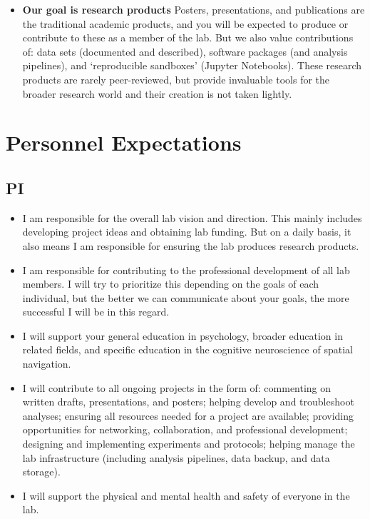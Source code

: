 \documentclass[
  12pt,
]{book}
\providecommand{\tightlist}{%
  \setlength{\itemsep}{0pt}\setlength{\parskip}{0pt}}
\begin{document}
\begin{itemize}
\item
  \textbf{Our goal is research products}
  Posters, presentations, and publications are the traditional academic products, and you will be expected to produce or contribute to these as a member of the lab. But we also value contributions of: data sets (documented and described), software packages (and analysis pipelines), and `reproducible sandboxes' (Jupyter Notebooks). These research products are rarely peer-reviewed, but provide invaluable tools for the broader research world and their creation is not taken lightly.
\end{itemize}

\hypertarget{personnel-expectations}{%
\chapter{Personnel Expectations}\label{personnel-expectations}}

\hypertarget{pi}{%
\section{PI}\label{pi}}

\begin{itemize}
\tightlist
\item
  I am responsible for the overall lab vision and direction. This mainly includes developing project ideas and obtaining lab funding. But on a daily basis, it also means I am responsible for ensuring the lab produces research products.
\item
  I am responsible for contributing to the professional development of all lab members. I will try to prioritize this depending on the goals of each individual, but the better we can communicate about your goals, the more successful I will be in this regard.
\item
  I will support your general education in psychology, broader education in related fields, and specific education in the cognitive neuroscience of spatial navigation.
\item
  I will contribute to all ongoing projects in the form of: commenting on written drafts, presentations, and posters; helping develop and troubleshoot analyses; ensuring all resources needed for a project are available; providing opportunities for networking, collaboration, and professional development; designing and implementing experiments and protocols; helping manage the lab infrastructure (including analysis pipelines, data backup, and data storage).
\item
  I will support the physical and mental health and safety of everyone in the lab.
\end{itemize}
\end{document}
